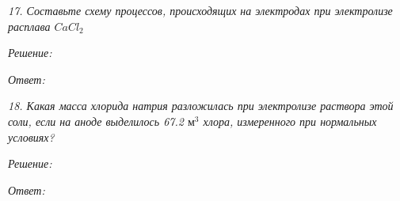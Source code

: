 \emph{17. Составьте схему процессов, происходящих на электродах при 
электролизе расплава \( CaCl_2 \)}

\emph{Решение:}

\emph{Ответ: }

\pagebreak

\emph{18. Какая масса хлорида натрия разложилась при электролизе раствора 
этой соли, если на аноде выделилось 67.2 \( \text{м}^3 \) хлора, 
измеренного при нормальных условиях?}

\emph{Решение:}

\emph{Ответ: }


